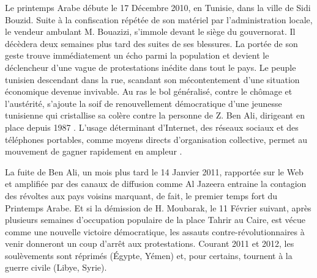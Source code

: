 \documentclass[symmetric,justified,marginals=raggedouter]{tufte-book}
\begin{document}
Le printemps Arabe débute le 17 Décembre 2010, en Tunisie, dans la ville de Sidi Bouzid. Suite à la confiscation répétée de son matériel par l'administration locale, le vendeur ambulant M. Bouazizi, s'immole devant le siège du gouvernorat. Il décèdera deux semaines plus tard des suites de ses blessures. La portée de son geste trouve immédiatement un écho parmi la population et devient le déclencheur d'une vague de protestations inédite dans tout le pays. Le peuple tunisien descendant dans la rue, scandant son mécontentement d'une situation économique devenue invivable. Au ras le bol généralisé, contre le chômage et l'austérité, s'ajoute la soif de renouvellement démocratique d'une jeunesse tunisienne qui cristallise sa colère contre la personne de Z. Ben Ali, dirigeant en place depuis 1987 \citep{salmon_29_2016}. L'usage déterminant d'Internet, des réseaux sociaux et des téléphones portables, comme moyens directs d'organisation collective, permet au mouvement de gagner rapidement en ampleur \citep{lotan_arab_2011, khondker_role_2011}.    

La fuite de Ben Ali, un mois plus tard le 14 Janvier 2011, rapportée sur le Web et amplifiée par des canaux de diffusion comme Al Jazeera entraine la contagion des révoltes aux pays voisins marquant, de fait, le premier temps fort du Printemps Arabe. Et si la démission de H. Moubarak, le 11 Février suivant, après plusieurs semaines d'occupation populaire de la place Tahrir au Caire, est vécue comme une nouvelle victoire démocratique, les assauts contre-révolutionnaires à venir donneront un coup d'arrêt aux protestations. Courant 2011 et 2012, les soulèvements sont réprimés (Égypte, Yémen) et, pour certains, tournent à la guerre civile (Libye, Syrie). \\
\end{document}
